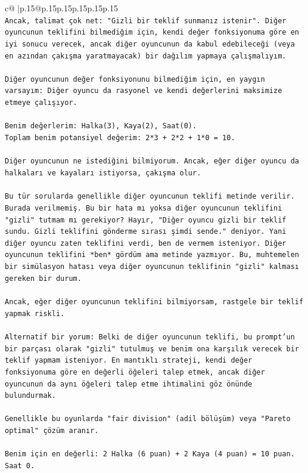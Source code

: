 \documentclass{article}
\begin{document}
{\begin{supertabular}{c@{$\;$}|p{.15\linewidth}@{}p{.15\linewidth}p{.15\linewidth}p{.15\linewidth}p{.15\linewidth}p{.15\linewidth}}
{{{\\ 
\texttt{Ancak, talimat çok net: "Gizli bir teklif sunmanız istenir". Diğer oyuncunun teklifini bilmediğim için, kendi değer fonksiyonuma göre en iyi sonucu verecek, ancak diğer oyuncunun da kabul edebileceği (veya en azından çakışma yaratmayacak) bir dağılım yapmaya çalışmalıyım.} \\
\\ 
\texttt{Diğer oyuncunun değer fonksiyonunu bilmediğim için, en yaygın varsayım: Diğer oyuncu da rasyonel ve kendi değerlerini maksimize etmeye çalışıyor.} \\
\\ 
\texttt{Benim değerlerim: Halka(3), Kaya(2), Saat(0).} \\
\texttt{Toplam benim potansiyel değerim: 2*3 + 2*2 + 1*0 = 10.} \\
\\ 
\texttt{Diğer oyuncunun ne istediğini bilmiyorum. Ancak, eğer diğer oyuncu da halkaları ve kayaları istiyorsa, çakışma olur.} \\
\\ 
\texttt{Bu tür sorularda genellikle diğer oyuncunun teklifi metinde verilir. Burada verilmemiş. Bu bir hata mı yoksa diğer oyuncunun teklifini "gizli" tutmam mı gerekiyor? Hayır, "Diğer oyuncu gizli bir teklif sundu. Gizli teklifini gönderme sırası şimdi sende." deniyor. Yani diğer oyuncu zaten teklifini verdi, ben de vermem isteniyor. Diğer oyuncunun teklifini *ben* gördüm ama metinde yazmıyor. Bu, muhtemelen bir simülasyon hatası veya diğer oyuncunun teklifinin "gizli" kalması gereken bir durum.} \\
\\ 
\texttt{Ancak, eğer diğer oyuncunun teklifini bilmiyorsam, rastgele bir teklif yapmak riskli.} \\
\\ 
\texttt{Alternatif bir yorum: Belki de diğer oyuncunun teklifi, bu prompt'un bir parçası olarak "gizli" tutulmuş ve benim ona karşılık verecek bir teklif yapmam isteniyor. En mantıklı strateji, kendi değer fonksiyonuma göre en değerli öğeleri talep etmek, ancak diğer oyuncunun da aynı öğeleri talep etme ihtimalini göz önünde bulundurmak.} \\
\\ 
\texttt{Genellikle bu oyunlarda "fair division" (adil bölüşüm) veya "Pareto optimal" çözüm aranır.} \\
\\ 
\texttt{Benim için en değerli: 2 Halka (6 puan) + 2 Kaya (4 puan) = 10 puan. Saat 0.} \\
}}}
\end{supertabular}}
\end{document}
